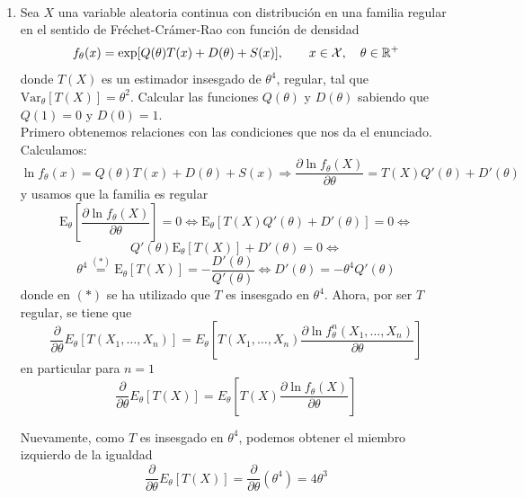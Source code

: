\documentclass[12pt]{article}
\newcommand{\E}{\mathrm{E}}
\newcommand{\V}{\mathrm{Var}}
\begin{document}
    \newpage

    \begin{ejercicio}
        \ \\
        \begin{enumerate}[label=\alph*)]
            \item Sea $X$ una variable aleatoria continua con distribución en una familia regular en 
                el sentido de Fréchet-Crámer-Rao con función de densidad
                \begin{equation*}
                    f_\theta(x) = \exp[Q(\theta) T(x) + D(\theta) + S(x)], \qquad x\in \mathcal{X}, \quad \theta\in \mathbb{R}^+
                \end{equation*}
                donde $T(X)$ es un estimador insesgado de $\theta^4$, regular, tal que 
                $\V_\theta[T(X)] = \theta^2$. Calcular las funciones $Q(\theta)$ y $D(\theta)$ sabiendo 
                que $Q(1) = 0$ y $D(0) = 1$. \\

                Primero obtenemos relaciones con las condiciones que nos da el enunciado. 
                Calculamos:
                $$\ln f_\theta(x) = Q(\theta) T(x) + D(\theta) + S(x) \Longrightarrow 
                \dfrac{\partial \ln f_\theta(X)}{\partial \theta} = T(X) Q'(\theta) + D'(\theta)$$
                y usamos que la familia es regular
                $$\E_\theta \left[ \dfrac{\partial \ln f_\theta(X)}{\partial \theta} \right] = 0 \iff 
                \E_\theta \left[ T(X) Q'(\theta) + D'(\theta) \right] = 0 \iff $$
                $$Q'(\theta) \E_\theta \left[ T(X) \right] + D'(\theta) = 0 \iff$$
                \begin{equation}\label{eq:rel1ej2a}
                    \theta^4 \stackrel{(*)}{=} \E_\theta[T(X)] = -\dfrac{D'(\theta)}{Q'(\theta)} \iff D'(\theta) = - \theta^4 Q'(\theta)
                \end{equation}
                donde en $(*)$ se ha utilizado que $T$ es insesgado en $\theta^4$. Ahora, por ser $T$ regular, se tiene que
                $$\dfrac{\partial}{\partial \theta} E_\theta[T(X_1, \ldots, X_n)] = E_\theta \left[T(X_1, \ldots, X_n) \dfrac{\partial \ln f_\theta^n (X_1, \ldots, X_n)}
                {\partial \theta} \right]$$
                en particular para $n=1$
                $$\dfrac{\partial}{\partial \theta} E_\theta[T(X)] = E_\theta \left[T(X) \dfrac{\partial \ln f_\theta (X)}
                {\partial \theta} \right]$$

                Nuevamente, como $T$ es insesgado en $\theta^4$, podemos obtener el miembro izquierdo 
                de la igualdad
                $$\dfrac{\partial}{\partial \theta} E_\theta[T(X)] = 
                \dfrac{\partial}{\partial \theta} (\theta^4) = 4 \theta^3$$


\end{enumerate}
\end{ejercicio}
\end{document}
